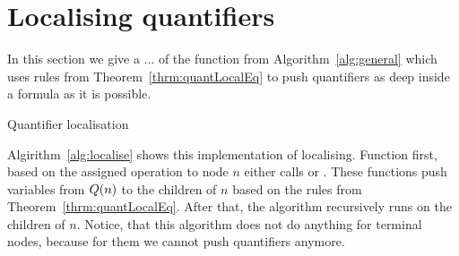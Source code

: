 \documentclass[
  digital, %
  twoside, %
  table,   %
  nolof,     %
  nolot,     %
]{fithesis3}
\theoremstyle{definition}
\theoremstyle{remark}
\newcommand{\fvars}[1]{V_{#1}^{\mathrm{free}}}
\newcommand{\qvars}[1]{V_{#1}^{Q}}
\begin{document}
\section{Localising quantifiers}
In this section we give a ... of the function  from Algorithm~\ref{alg:general} which uses rules from Theorem~\ref{thrm:quantLocalEq} to push quantifiers as deep inside a formula as it is possible. %

\begin{algorithm}
  \caption{Quantifier localisation}
  \label{alg:localise}
  \begin{algorithmic}[1]
        \State {}
        \State {}
      \EndIf
        \State {}
      \EndFor
    \EndFunction
  \end{algorithmic}
\end{algorithm}

Algirithm~\ref{alg:localise} shows this implementation of localising. Function  first, based on the assigned operation to node $n$ either calls  or . These functions push variables from $Q({n})$ to the children of $n$ based on the rules from Theorem~\ref{thrm:quantLocalEq}. After that, the algorithm recursively runs  on the children of $n$. Notice, that this algorithm does not do anything for terminal nodes, because for them we cannot push quantifiers anymore.
\end{document}
